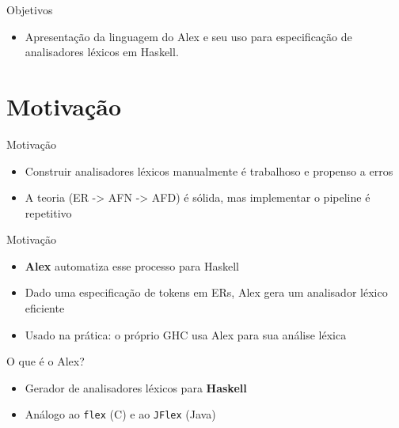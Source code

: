\subtitle{\bf Aula 4 - Motivação}
\begin{frame}[t,plain]
    \titlepage
\end{frame}

\begin{frame}{Objetivos}

    \begin{itemize}

        \item
        Apresentação da linguagem do Alex e seu uso para especificação de
        analisadores léxicos em Haskell.
    \end{itemize}
\end{frame}


\section{Motivação}\label{motivauxe7uxe3o}

\begin{frame}{Motivação}

    \begin{itemize}

        \item
        Construir analisadores léxicos manualmente é trabalhoso e propenso a
        erros
        \item
        A teoria (ER -> AFN -> AFD) é sólida, mas implementar o pipeline é
        repetitivo
    \end{itemize}
\end{frame}

\begin{frame}{Motivação}

    \begin{itemize}

        \item
        \textbf{Alex} automatiza esse processo para Haskell
        \item
        Dado uma especificação de tokens em ERs, Alex gera um analisador
        léxico eficiente
        \item
        Usado na prática: o próprio GHC usa Alex para sua análise léxica
    \end{itemize}
\end{frame}



\begin{frame}[fragile]{O que é o Alex?}

    \begin{itemize}

        \item
        Gerador de analisadores léxicos para \textbf{Haskell}
        \item
        Análogo ao \texttt{flex} (C) e ao
        \texttt{JFlex} (Java)
    \end{itemize}
\end{frame}

